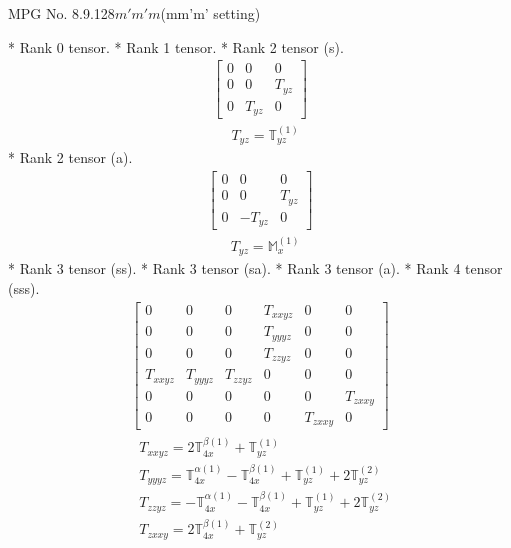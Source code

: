 \documentclass[fleqn,8pt,landscape]{jsarticle}
\begin{document}
\setcounter{MaxMatrixCols}{32}

\renewcommand{\tablename}{Table~}
\renewcommand{\figurename}{Figure~}
\begin{center}
\LARGE
MPG No. 8.9.128\quad$m'm'm$\quad(mm'm' setting)
\end{center}
* Rank 0 tensor.
* Rank 1 tensor.
* Rank 2 tensor (s).
\begin{align*}
\begin{bmatrix} 0 & 0 & 0 \\ 0 & 0 & T_{yz} \\ 0 & T_{yz} & 0 \end{bmatrix}
\end{align*}
\begin{align*}
& T_{yz} = \mathbb{T}_{yz}^{(1)}
\end{align*}
* Rank 2 tensor (a).
\begin{align*}
\begin{bmatrix} 0 & 0 & 0 \\ 0 & 0 & T_{yz} \\ 0 & - T_{yz} & 0 \end{bmatrix}
\end{align*}
\begin{align*}
& T_{yz} = \mathbb{M}_{x}^{(1)}
\end{align*}
* Rank 3 tensor (ss).
* Rank 3 tensor (sa).
* Rank 3 tensor (a).
* Rank 4 tensor (sss).
\begin{align*}
\begin{bmatrix} 0 & 0 & 0 & T_{xxyz} & 0 & 0 \\ 0 & 0 & 0 & T_{yyyz} & 0 & 0 \\ 0 & 0 & 0 & T_{zzyz} & 0 & 0 \\ T_{xxyz} & T_{yyyz} & T_{zzyz} & 0 & 0 & 0 \\ 0 & 0 & 0 & 0 & 0 & T_{zxxy} \\ 0 & 0 & 0 & 0 & T_{zxxy} & 0 \end{bmatrix}
\end{align*}
\begin{align*}
& T_{xxyz} = 2 \mathbb{T}_{4x}^{\beta(1)} + \mathbb{T}_{yz}^{(1)} \\
& T_{yyyz} = \mathbb{T}_{4x}^{\alpha(1)} - \mathbb{T}_{4x}^{\beta(1)} + \mathbb{T}_{yz}^{(1)} + 2 \mathbb{T}_{yz}^{(2)} \\
& T_{zzyz} = - \mathbb{T}_{4x}^{\alpha(1)} - \mathbb{T}_{4x}^{\beta(1)} + \mathbb{T}_{yz}^{(1)} + 2 \mathbb{T}_{yz}^{(2)} \\
& T_{zxxy} = 2 \mathbb{T}_{4x}^{\beta(1)} + \mathbb{T}_{yz}^{(2)}
\end{align*}
\end{document}
